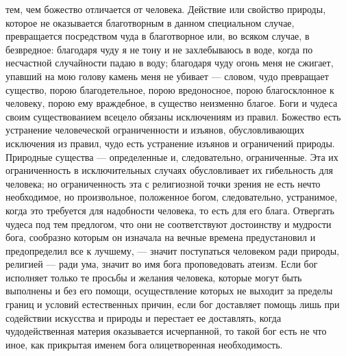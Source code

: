 \documentclass[12pt]{article}
\begin{document}
тем, чем божество отличается от человека. Действие или свойство природы, которое не оказывается благотворным в данном специальном случае, превращается посредством чуда в благотворное или, во всяком случае, в безвредное: благодаря чуду я не тону и не захлебываюсь в воде, когда по несчастной случайности падаю в воду; благодаря чуду огонь меня не сжигает, упавший на мою голову камень меня не убивает --- словом, чудо превращает существо, порою благодетельное, порою вредоносное, порою благосклонное к человеку, порою ему враждебное, в существо неизменно благое. Боги и чудеса своим существованием всецело обязаны исключениям из правил. Божество есть устранение человеческой ограниченности и изъянов, обусловливающих исключения из правил, чудо есть устранение изъянов и ограничений природы. Природные существа --- определенные и, следовательно, ограниченные. Эта их ограниченность в исключительных случаях обусловливает их гибельность для человека; но ограниченность эта с религиозной точки зрения не есть нечто необходимое, но произвольное, положенное богом, следовательно, устранимое, когда это требуется для надобности человека, то есть для его блага. Отвергать чудеса под тем предлогом, что они не соответствуют достоинству и мудрости бога, сообразно которым он изначала на вечные времена предустановил и предопределил все к лучшему, --- значит поступаться человеком ради природы, религией --- ради ума, значит во имя бога проповедовать атеизм. Если бог исполняет только те просьбы и желания человека, которые могут быть выполнены и без его помощи, осуществление которых не выходит за пределы границ и условий естественных причин, если бог доставляет помощь лишь при содействии искусства и природы и перестает ее доставлять, когда чудодейственная материя оказывается исчерпанной, то такой бог есть не что иное, как прикрытая именем бога олицетворенная необходимость.


\section{}
\end{document}
